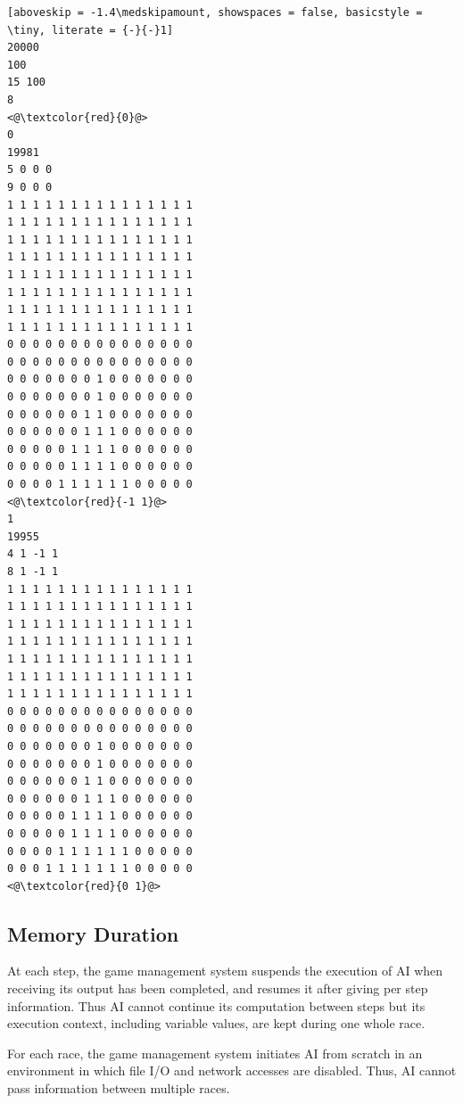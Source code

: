 \documentclass[11pt]{article}
\begin{document}
\begin{minipage}[t]{.3\textwidth}
\begin{lstlisting}[aboveskip = -1.4\medskipamount, showspaces = false, basicstyle = \tiny, literate = {-}{-}1]
20000
100
15 100
8
<@\textcolor{red}{0}@>
0
19981
5 0 0 0
9 0 0 0
1 1 1 1 1 1 1 1 1 1 1 1 1 1 1
1 1 1 1 1 1 1 1 1 1 1 1 1 1 1
1 1 1 1 1 1 1 1 1 1 1 1 1 1 1
1 1 1 1 1 1 1 1 1 1 1 1 1 1 1
1 1 1 1 1 1 1 1 1 1 1 1 1 1 1
1 1 1 1 1 1 1 1 1 1 1 1 1 1 1
1 1 1 1 1 1 1 1 1 1 1 1 1 1 1
1 1 1 1 1 1 1 1 1 1 1 1 1 1 1
0 0 0 0 0 0 0 0 0 0 0 0 0 0 0
0 0 0 0 0 0 0 0 0 0 0 0 0 0 0
0 0 0 0 0 0 0 1 0 0 0 0 0 0 0
0 0 0 0 0 0 0 1 0 0 0 0 0 0 0
0 0 0 0 0 0 1 1 0 0 0 0 0 0 0
0 0 0 0 0 0 1 1 1 0 0 0 0 0 0
0 0 0 0 0 1 1 1 1 0 0 0 0 0 0
0 0 0 0 0 1 1 1 1 0 0 0 0 0 0
0 0 0 0 1 1 1 1 1 1 0 0 0 0 0
<@\textcolor{red}{-1 1}@>
1
19955
4 1 -1 1
8 1 -1 1
1 1 1 1 1 1 1 1 1 1 1 1 1 1 1
1 1 1 1 1 1 1 1 1 1 1 1 1 1 1
1 1 1 1 1 1 1 1 1 1 1 1 1 1 1
1 1 1 1 1 1 1 1 1 1 1 1 1 1 1
1 1 1 1 1 1 1 1 1 1 1 1 1 1 1
1 1 1 1 1 1 1 1 1 1 1 1 1 1 1
1 1 1 1 1 1 1 1 1 1 1 1 1 1 1
0 0 0 0 0 0 0 0 0 0 0 0 0 0 0
0 0 0 0 0 0 0 0 0 0 0 0 0 0 0
0 0 0 0 0 0 0 1 0 0 0 0 0 0 0
0 0 0 0 0 0 0 1 0 0 0 0 0 0 0
0 0 0 0 0 0 1 1 0 0 0 0 0 0 0
0 0 0 0 0 0 1 1 1 0 0 0 0 0 0
0 0 0 0 0 1 1 1 1 0 0 0 0 0 0
0 0 0 0 0 1 1 1 1 0 0 0 0 0 0
0 0 0 0 1 1 1 1 1 1 0 0 0 0 0
0 0 0 1 1 1 1 1 1 1 0 0 0 0 0
<@\textcolor{red}{0 1}@>
\end{lstlisting}
\end{minipage}

\subsection{Memory Duration}
At each step, the game management system suspends the execution of AI
when receiving its output has been completed, and resumes it after
giving per step information.  Thus AI cannot continue its computation
between steps but its execution context, including variable values,
are kept during one whole race.

For each race, the game management system initiates AI from scratch in
an environment in which file I/O and network accesses are disabled.
Thus, AI cannot pass information between multiple races.
\end{document}
